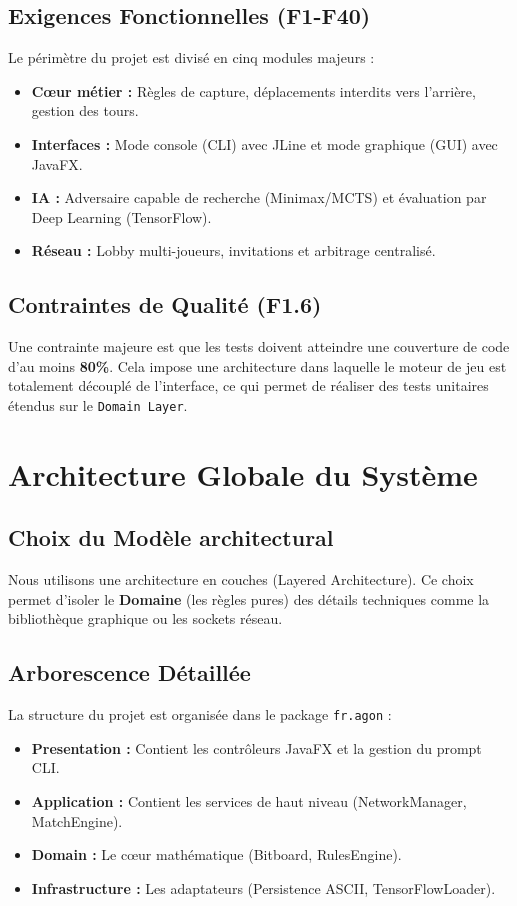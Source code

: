 \documentclass[10pt]{article} %
\begin{document}
\subsection{Exigences Fonctionnelles (F1-F40)}
Le périmètre du projet est divisé en cinq modules majeurs :
\begin{itemize}
    \item \textbf{Cœur métier :} Règles de capture, déplacements interdits vers l'arrière, gestion des tours.
    \item \textbf{Interfaces :} Mode console (CLI) avec JLine et mode graphique (GUI) avec JavaFX.
    \item \textbf{IA :} Adversaire capable de recherche (Minimax/MCTS) et évaluation par Deep Learning (TensorFlow).
    \item \textbf{Réseau :} Lobby multi-joueurs, invitations et arbitrage centralisé.
\end{itemize}

\subsection{Contraintes de Qualité (F1.6)}
Une contrainte majeure est que les tests doivent atteindre une couverture de code d'au moins \textbf{80\%}. Cela impose une architecture dans laquelle le moteur de jeu est totalement découplé de l'interface, ce qui permet de réaliser des tests unitaires étendus sur le \texttt{Domain Layer}.

\section{Architecture Globale du Système}
\subsection{Choix du Modèle architectural}
Nous utilisons une architecture en couches (Layered Architecture). Ce choix permet d'isoler le \textbf{Domaine} (les règles pures) des détails techniques comme la bibliothèque graphique ou les sockets réseau.


\subsection{Arborescence Détaillée}
La structure du projet est organisée dans le package \texttt{fr.agon} :
\begin{itemize}
    \item \textbf{Presentation :} Contient les contrôleurs JavaFX et la gestion du prompt CLI.
    \item \textbf{Application :} Contient les services de haut niveau (NetworkManager, MatchEngine).
    \item \textbf{Domain :} Le cœur mathématique (Bitboard, RulesEngine).
    \item \textbf{Infrastructure :} Les adaptateurs (Persistence ASCII, TensorFlowLoader).
\end{itemize}
\end{document}
